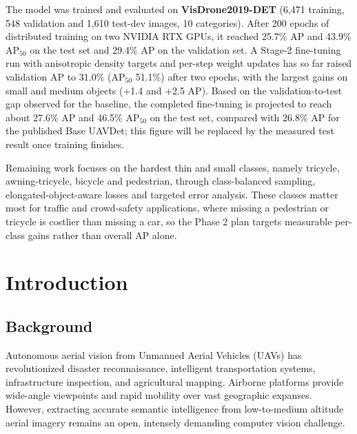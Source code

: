 \documentclass[12pt,a4paper]{report}
\begin{document}
The model was trained and evaluated on \textbf{VisDrone2019-DET} (6,471 training, 548 validation and 1,610 test-dev images, 10 categories). After 200 epochs of distributed training on two NVIDIA RTX GPUs, it reached 25.7\% AP and 43.9\% $\text{AP}_{50}$ on the test set and 29.4\% AP on the validation set. A Stage-2 fine-tuning run with anisotropic density targets and per-step weight updates has so far raised validation AP to 31.0\% ($\text{AP}_{50}$ 51.1\%) after two epochs, with the largest gains on small and medium objects (+1.4 and +2.5 AP). Based on the validation-to-test gap observed for the baseline, the completed fine-tuning is projected to reach about 27.6\% AP and 46.5\% $\text{AP}_{50}$ on the test set, compared with 26.8\% AP for the published Base UAVDet; this figure will be replaced by the measured test result once training finishes.

Remaining work focuses on the hardest thin and small classes, namely tricycle, awning-tricycle, bicycle and pedestrian, through class-balanced sampling, elongated-object-aware losses and targeted error analysis. These classes matter most for traffic and crowd-safety applications, where missing a pedestrian or tricycle is costlier than missing a car, so the Phase 2 plan targets measurable per-class gains rather than overall AP alone.

\newpage
\setcounter{tocdepth}{2}
\tableofcontents
\newpage
{}

\chapter{Introduction}

\section{Background}
Autonomous aerial vision from Unmanned Aerial Vehicles (UAVs) has revolutionized disaster reconnaissance, intelligent transportation systems, infrastructure inspection, and agricultural mapping. Airborne platforms provide wide-angle viewpoints and rapid mobility over vast geographic expanses. However, extracting accurate semantic intelligence from low-to-medium altitude aerial imagery remains an open, intensely demanding computer vision challenge. 
\end{document}
